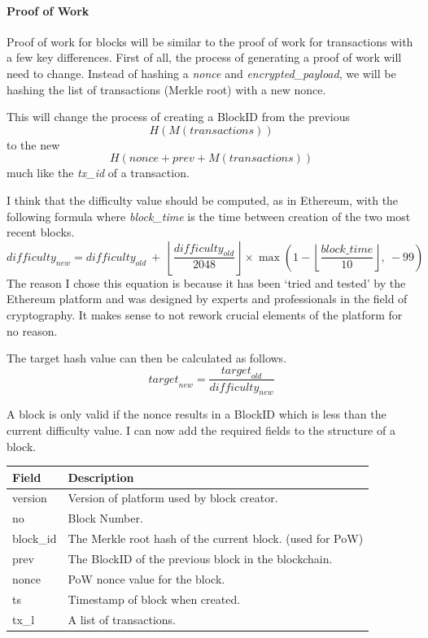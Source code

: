 \documentclass{article}
\begin{document}
\paragraph{Proof of Work}
Proof of work for blocks will be similar to the proof of work for transactions with a few key differences. First of all, the process of generating a proof of work will need to change. Instead of hashing a \textit{nonce} and \textit{encrypted\_payload}, we will be hashing the list of transactions (Merkle root) with a new nonce.

This will change the process of creating a BlockID from the previous \[H(M(\textit{transactions}))\] to the new \[H(\textit{nonce} + \textit{prev} +  M(\textit{transactions}))\] much like the \textit{tx\_id} of a transaction.

I think that the difficulty value should be computed, as in Ethereum, with the following formula where \textit{block\_time} is the time between creation of the two most recent blocks.
\[\textit{difficulty}_{\textit{new}} = \textit{difficulty}_{\textit{old}}
\ + \ \left\lfloor\dfrac{\textit{difficulty}_{\textit{old}}}{2048}\right\rfloor \times \max\left(1- \left\lfloor \frac{\textit{block\_time}}{10} \right\rfloor,\ -99\right)\]
The reason I chose this equation is because it has been `tried and tested' by the Ethereum platform and was designed by experts and professionals in the field of cryptography. It makes sense to not rework crucial elements of the platform for no reason.

The target hash value can then be calculated as follows.
\[\textit{target}_{\textit{new}} = \frac{\textit{target}_{\textit{old}}} {\textit{difficulty}_{\textit{new}}}\]

A block is only valid if the nonce results in a BlockID which is less than the current difficulty value. I can now add the required fields to the structure of a block.
\begin{table}[H]
\centering
\begin{tabular}{|p{2.5cm}|p{8.5cm}|}
\hline
\rowcolor{tblgrey} 
Field      & Description                                         \\ \hline
version    & Version of platform used by block creator.          \\ \hline
no         & Block Number.                                       \\ \hline
block\_id  & The Merkle root hash of the current block. (used for PoW)  \\ \hline
prev       & The BlockID of the previous block in the blockchain.   \\ \hline
nonce      & PoW nonce value for the block.                      \\ \hline
ts         & Timestamp of block when created.                    \\ \hline
tx\_l       & A list of transactions.                            \\ \hline
\end{tabular}
\end{table}
\end{document}

